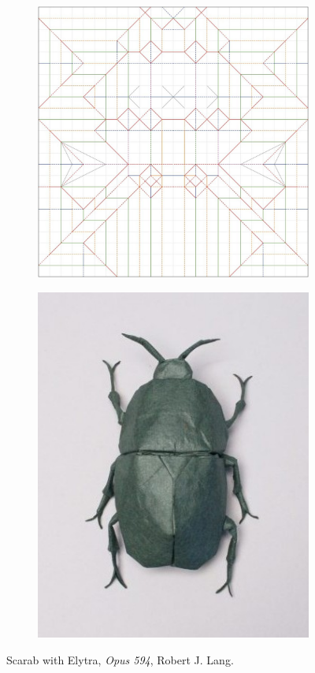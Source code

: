 \documentclass[handout]{beamer}
\begin{document}
    \begin{frame}
        \begin{figure}
            \centering
            \begin{subfigure}
                \centering
                \includegraphics[width=0.54\linewidth]{scarab_pattern.jpg}
            \end{subfigure}
            \begin{subfigure}
                \centering
                \includegraphics[width=0.43\linewidth]{scarab.jpg}
            \end{subfigure}
            \caption{Scarab with Elytra, \emph{Opus 594}, Robert J. Lang.}
            \label{fig:scarab}
        \end{figure}
    \end{frame}
\end{document}
